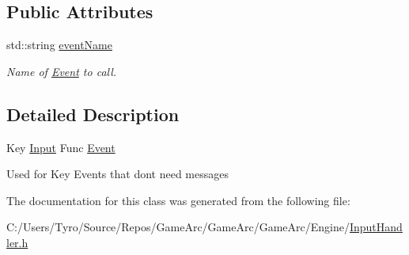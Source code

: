 \subsection*{Public Attributes}
\begin{DoxyCompactItemize}
\item 
\mbox{\label{class_key_input_func_event_a18b0a8c56401b0e21cd0f2e4794e65a5}} 
std\+::string \mbox{\hyperlink{class_key_input_func_event_a18b0a8c56401b0e21cd0f2e4794e65a5}{event\+Name}}
\begin{DoxyCompactList}\small\item\em Name of \mbox{\hyperlink{class_event}{Event}} to call. \end{DoxyCompactList}\end{DoxyCompactItemize}


\subsection{Detailed Description}
Key \mbox{\hyperlink{class_input}{Input}} Func \mbox{\hyperlink{class_event}{Event}}

Used for Key Events that don\textquotesingle{}t need messages 

The documentation for this class was generated from the following file\+:\begin{DoxyCompactItemize}
\item 
C\+:/\+Users/\+Tyro/\+Source/\+Repos/\+Game\+Arc/\+Game\+Arc/\+Game\+Arc/\+Engine/\mbox{\hyperlink{_input_handler_8h}{Input\+Handler.\+h}}\end{DoxyCompactItemize}
